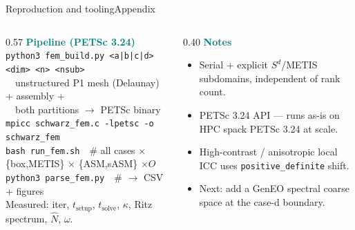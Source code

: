 \documentclass[aspectratio=169,10pt]{beamer}
\begin{document}
\begin{frame}{Reproduction and tooling}{Appendix}
  \begin{columns}[T]
  \begin{column}{0.57\linewidth}\footnotesize
   \textcolor{teal}{\textbf{Pipeline (PETSc 3.24)}}\\[3pt]
   \texttt{\scriptsize python3 fem\_build.py <a|b|c|d> <dim> <n> <nsub>}\\
   {\scriptsize\color{muted}\ \ unstructured P1 mesh (Delaunay) + assembly +\\ \ \ both partitions $\to$ PETSc binary}\\[3pt]
   \texttt{\scriptsize mpicc schwarz\_fem.c -lpetsc -o schwarz\_fem}\\
   \texttt{\scriptsize bash run\_fem.sh}\ \ {\scriptsize\color{muted}\# all cases $\times$ \{box,METIS\} $\times$ \{ASM,sASM\} $\times O$}\\
   \texttt{\scriptsize python3 parse\_fem.py}\ \ {\scriptsize\color{muted}\# $\to$ CSV + figures}\\[6pt]
   {\scriptsize Measured: iter, $t_{\text{setup}}$, $t_{\text{solve}}$, $\kappa$, Ritz spectrum, $\hat N$, $\omega$.}
  \end{column}
  \begin{column}{0.40\linewidth}\footnotesize
   \textcolor{teal}{\textbf{Notes}}
   \begin{itemize}\setlength\itemsep{0.45em}
     \item Serial + explicit $S^d$/METIS subdomains, independent of rank count.
     \item PETSc 3.24 API --- runs as-is on HPC spack PETSc 3.24 at scale.
     \item High-contrast / anisotropic local ICC uses \texttt{\scriptsize positive\_definite} shift.
     \item Next: add a GenEO spectral coarse space at the case-d boundary.
   \end{itemize}
  \end{column}
  \end{columns}
\end{frame}
\end{document}
